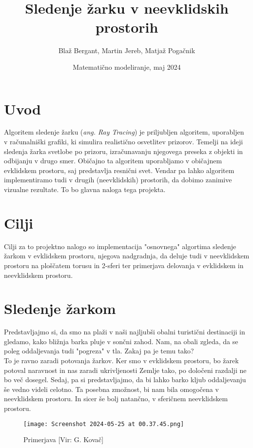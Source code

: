\documentclass[titlepage]{article}
\title{Sledenje žarku v neevklidskih prostorih}
\author{Blaž Bergant, Martin Jereb, Matjaž Pogačnik}
\date{Matematično modeliranje, maj 2024}
\begin{document}
\doublespacing

\maketitle
\newpage
\tableofcontents
\newpage


\section{Uvod}
Algoritem sledenje žarku (\textit{ang. Ray Tracing}) je priljubljen algoritem, uporabljen v računalniški grafiki, ki simulira realistično osvetlitev prizorov. Temelji na ideji sledenja žarka svetlobe po prizoru, izračunavanju njegovega preseka z objekti in odbijanju v drugo smer. Običajno ta algoritem uporabljamo v običajnem evklidskem prostoru, saj predstavlja resnični svet. Vendar pa lahko algoritem implementiramo tudi v drugih (neevklidskih) prostorih, da dobimo zanimive vizualne rezultate. To bo glavna naloga tega projekta.

\section{Cilji}
Cilji za to projektno nalogo so implementacija "osnovnega" algortima sledenje žarkom v evklidskem prostoru, njegova nadgradnja, da deluje tudi v neevklidskem prostoru na ploščatem torusu in 2-sferi ter primerjava delovanja v evklidskem in neevklidskem prostoru.

\section{Sledenje žarkom}

Predstavljajmo si, da smo na plaži v naši najljubši obalni turistični destinaciji in gledamo, kako bližnja barka pluje v sončni zahod. Nam, na obali zgleda, da se poleg oddaljevanja tudi "pogreza" v tla. Zakaj pa je temu tako? \\

To je ravno zaradi potovanja žarkov. Ker smo v evklidskem prostoru, bo žarek potoval naravnost in nas zaradi ukrivljenosti Zemlje tako, po določeni razdalji ne bo več dosegel. Sedaj, pa si predstavljajmo, da bi lahko barko kljub oddaljevanju še vedno videli celotno. Ta posebna zmožnost, bi nam bila omogočena v neevklidskem prostoru. In sicer še bolj natančno, v sferičnem neevklidskem prostoru.\\

\begin{figure}
    \centering
    \texttt{[image: Screenshot 2024-05-25 at 00.37.45.png]}
    \caption{Primerjava [Vir: G. Kovač]}
    \label{Slika:enter-label}
\end{figure}
\end{document}

